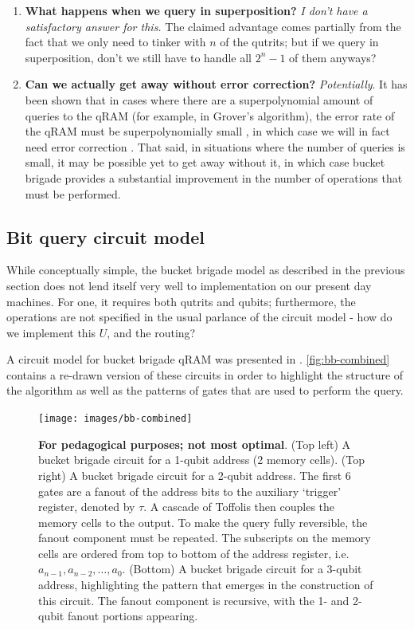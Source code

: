 \documentclass[a4paper,12pt]{article}
\begin{document}
\begin{enumerate} 
 \item \textbf{What happens when we query in superposition?} 
  \emph{I don't have a satisfactory answer for this.} 
  The claimed advantage comes partially from the fact that we only need to tinker with $n$ of the qutrits; but if we query in superposition, don't we still have to handle all $2^n - 1$ of them anyways?
 \item \textbf{Can we actually get away without error correction?} \emph{Potentially}. 
 It has been shown that in cases where there are a superpolynomial amount of queries to the qRAM (for example, in Grover's algorithm), the error rate of the qRAM must be superpolynomially small \cite{Regev2008}, in which case we will in fact need error correction \cite{Arunachalam2015}. 
 That said, in situations where the number of queries is small, it may be possible yet to get away without it, in which case bucket brigade provides a substantial improvement in the number of operations that must be performed.
\end{enumerate}



\subsection{Bit query circuit model}

While conceptually simple, the bucket brigade model as described in the previous section does not lend itself very well to implementation on our present day machines. 
For one, it requires both qutrits and qubits; furthermore, the operations are not specified in the usual parlance of the circuit model - how do we implement this $U$, and the routing?

A circuit model for bucket brigade qRAM was presented in \cite{Arunachalam2015}.
\autoref{fig:bb-combined} contains a re-drawn version of these circuits in order to highlight the structure of the algorithm as well as the patterns of gates that are used to perform the query.

\begin{figure}
 \centering
  \captionsetup{width=.89\linewidth}
 \texttt{[image: images/bb-combined]}
 \caption{\textbf{For pedagogical purposes; not most optimal}. 
 (Top left) A bucket brigade circuit for a 1-qubit address (2 memory cells). 
 (Top right) A bucket brigade circuit for a 2-qubit address. 
 The first 6 gates are a fanout of the address bits to the auxiliary `trigger' register, denoted by $\tau$. 
 A cascade of Toffolis then couples the memory cells to the output. 
 To make the query fully reversible, the fanout component must be repeated. 
 The subscripts on the memory cells are ordered from top to bottom of the address register, i.e. $a_{n-1}, a_{n-2}, \ldots, a_0$. 
 (Bottom) A bucket brigade circuit for a 3-qubit address, highlighting the pattern that emerges in the construction of this circuit. 
 The fanout component is recursive, with the 1- and 2-qubit fanout portions appearing.}
 \label{fig:bb-combined}
\end{figure}
\end{document}

